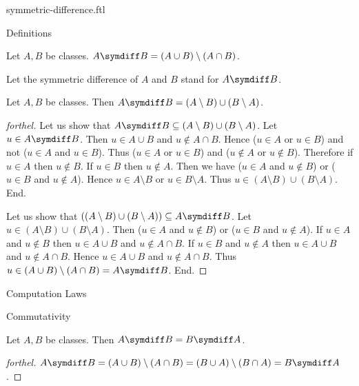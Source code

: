 \documentclass{naproche-library}
\begin{document}
\begin{smodule}[title=Symmetric Difference]{symmetric-difference.ftl}

\begin{sfragment}{Definitions}
  \begin{definition}[forthel,id=FOUNDATIONS_03_7457594151010304]
    Let $A, B$ be classes.
    $A \symdiff B = (A \cup B) \setminus (A \cap B)$.

    Let the symmetric difference of $A$ and $B$ stand for $A \symdiff B$.
  \end{definition}

  \begin{proposition}[forthel,id=FOUNDATIONS_03_4886447211413504]
    Let $A, B$ be classes.
    Then $A \symdiff B = (A \setminus B) \cup (B \setminus A)$.
  \end{proposition}
  \begin{proof}[forthel]
    Let us show that $A \symdiff B \subseteq (A \setminus B) \cup (B \setminus A)$.
      Let $u \in A \symdiff B$.
      Then $u \in A \cup B$ and $u \notin A \cap B$.
      Hence ($u \in A$ or $u \in B$) and not ($u \in A$ and $u \in B$).
      Thus ($u \in A$ or $u \in B$) and ($u \notin A$ or $u \notin B$).
      Therefore if $u \in A$ then $u \notin B$.
      If $u \in B$ then $u \notin A$.
      Then we have ($u \in A$ and $u \notin B$) or ($u \in B$ and $u \notin A$).
      Hence $u \in A \setminus B$ or $u \in B \setminus A$.
      Thus $u \in (A \setminus B) \cup (B \setminus A)$.
    End.

    Let us show that $((A \setminus B) \cup (B \setminus A)) \subseteq A \symdiff B$. %
      Let $u \in (A \setminus B) \cup (B \setminus A)$.
      Then ($u \in A$ and $u \notin B$) or ($u \in B$ and $u \notin A$).
      If $u \in A$ and $u \notin B$ then $u \in A \cup B$ and $u \notin A \cap B$.
      If $u \in B$ and $u \notin A$ then $u \in A \cup B$ and $u \notin A \cap B$.
      Hence $u \in A \cup B$ and $u \notin A \cap B$.
      Thus $u \in (A \cup B) \setminus (A \cap B) = A \symdiff B$.
    End.
  \end{proof}
\end{sfragment}

\begin{sfragment}{Computation Laws}
  \begin{sfragment}{Commutativity}
    \begin{proposition}[forthel,id=FOUNDATIONS_03_4518372049944576]
      Let $A, B$ be classes.
      Then $A \symdiff B = B \symdiff A$.
    \end{proposition}
    \begin{proof}[forthel]
      $A \symdiff B
        = (A \cup B) \setminus (A \cap B)
        = (B \cup A) \setminus (B \cap A)
        = B \symdiff A$.
    \end{proof}
  \end{sfragment}


\end{sfragment}
\end{smodule}
\end{document}
